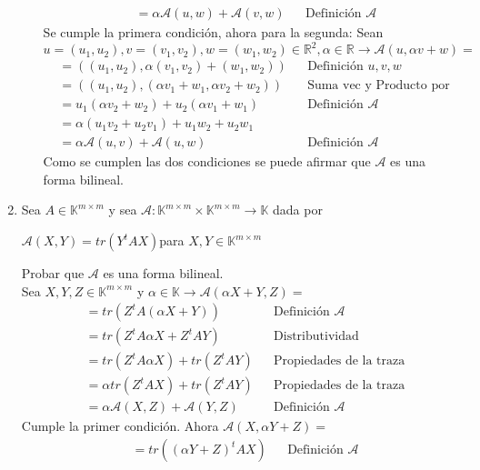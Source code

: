 \documentclass{article}
\newcommand{\R}{\mathbb{R}}
\newcommand{\A}{\mathcal{A}}
\begin{document}
\begin{enumerate}
\begin{enumerate}
\begin{align*}
                    &=\alpha \A(u,w)+\A(v,w)&&\text{Definición }\A
                \end{align*}
                Se cumple la primera condición, ahora para la segunda:
                Sean $u=(u_1,u_2),v=(v_1,v_2),w=(w_1,w_2)\in \R^2, \alpha \in \R\to \A(u,\alpha v+w)=$
                \begin{align*}
                    &=((u_1,u_2),\alpha (v_1,v_2)+(w_1,w_2)) &&\text{Definición $u,v,w$}\\
                    &=((u_1,u_2),(\alpha v_1+w_1,\alpha v_2+w_2)) &&\text{Suma vec y Producto por escalar}\\
                    &=u_1(\alpha v_2+w_2)+u_2(\alpha v_1+w_1)&&\text{Definición } \A\\
                    &=\alpha(u_1v_2+u_2v_1)+u_1w_2+u_2w_1\\
                    &=\alpha \A(u,v)+\A(u,w)&&\text{Definición }\A
                \end{align*}
                Como se cumplen las dos condiciones se puede afirmar que $\A$ es una forma bilineal.
            \end{enumerate}
        \item Sea $A\in\mathbb{K}^{m\times m}$ y sea $\A:\mathbb{K}^{m\times m}\times \mathbb{K}^{m\times m}\to \mathbb{K}$ dada por
            \begin{center}
                $\A(X,Y)=tr(Y^tAX)$\quad para $X,Y\in\mathbb{K}^{m\times m}$
            \end{center}
            Probar que $\A$ es una forma bilineal.\\
            Sea $X,Y,Z\in \mathbb{K}^{m\times m}$ y $\alpha \in \mathbb{K}\to \A(\alpha X+Y,Z)=$
            \begin{align*}
                &=tr(Z^tA(\alpha X+Y))&&\text{Definición }\A\\
                &=tr(Z^tA\alpha X+Z^tAY)&&\text{Distributividad}\\
                &=tr(Z^tA\alpha X)+tr(Z^tAY)&&\text{Propiedades de la traza}\\
                &=\alpha tr(Z^tAX)+tr(Z^tAY)&&\text{Propiedades de la traza}\\
                &=\alpha\A(X,Z)+\A(Y,Z)&&\text{Definición }\A
            \end{align*}
            Cumple la primer condición. Ahora $\A(X,\alpha Y+Z)=$
            \begin{align*}
                &=tr((\alpha Y+Z)^tAX)&&\text{Definición }\A\\

\end{align*}
\end{enumerate}
\end{document}
